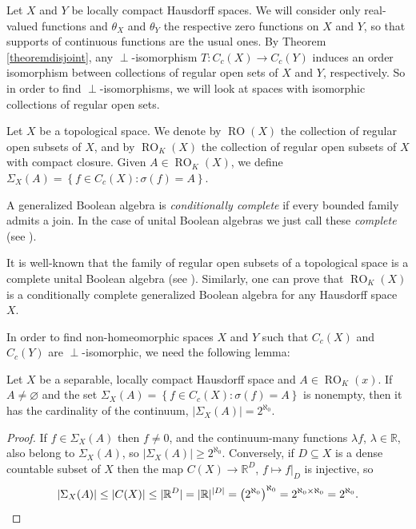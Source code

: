 Let $X$ and $Y$ be locally compact Hausdorff spaces. We will consider only real-valued functions and $\theta_X$ and $\theta_Y$ the respective zero functions on $X$ and $Y$, so that supports of continuous functions are the usual ones. By Theorem \ref{theoremdisjoint}, any $\perp$-isomorphism $T:C_c(X)\to C_c(Y)$ induces an order isomorphism between collections of regular open sets of $X$ and $Y$, respectively. So in order to find $\perp$-isomorphisms, we will look at spaces with isomorphic collections of regular open sets.

\begin{definition}
	Let $X$ be a topological space. We denote by $\operatorname{RO}(X)$ the collection of regular open subsets of $X$, and by $\operatorname{RO}_K(X)$ the collection of regular open subsets of $X$ with compact closure. Given $A\in \operatorname{RO}_K(X)$, we define $\Sigma_X(A)=\left\{f\in C_c(X):\sigma(f)=A\right\}$.
\end{definition}

A generalized Boolean algebra is \emph{conditionally complete} if every bounded family admits a join. In the case of unital Boolean algebras we just call these \emph{complete} (see \cite[Definition I-4.5]{MR1975381}).

It is well-known that the family of regular open subsets of a topological space is a complete unital Boolean algebra (see \cite[Theorem 10.1]{MR2466574}). Similarly, one can prove that $\operatorname{RO}_K(X)$ is a conditionally complete generalized Boolean algebra for any Hausdorff space $X$.
	
In order to find non-homeomorphic spaces $X$ and $Y$ such that $C_c(X)$ and $C_c(Y)$ are $\perp$-isomorphic, we need the following lemma:

\begin{lemma}\label{lemmacardinalityofbigsigma}
	Let $X$ be a separable, locally compact Hausdorff space and $A\in\operatorname{RO}_K(x)$. If $A\neq\varnothing$ and the set $\Sigma_X(A)=\left\{f\in C_c(X):\sigma(f)=A\right\}$ is nonempty, then it has the cardinality of the continuum, $|\Sigma_X(A)|=2^{\aleph_0}$.
\end{lemma}
\begin{proof}
	If $f\in\Sigma_X(A)$ then $f\neq 0$, and the continuum-many functions $\lambda f$, $\lambda\in\mathbb{R}$, also belong to $\Sigma_X(A)$, so $|\Sigma_X(A)|\geq 2^{\aleph_0}$. Conversely, if $D\subseteq X$ is a dense countable subset of $X$ then the map $C(X)\to\mathbb{R}^D$, $f\mapsto f|_D$ is injective, so
	\[|\Sigma_X(A)|\leq|C(X)|\leq|\mathbb{R}^D|=|\mathbb{R}|^{|D|}=\left(2^{\aleph_0}\right)^{\aleph_0}=2^{\aleph_0\times\aleph_0}=2^{\aleph_0}.\qedhere\]
\end{proof}

